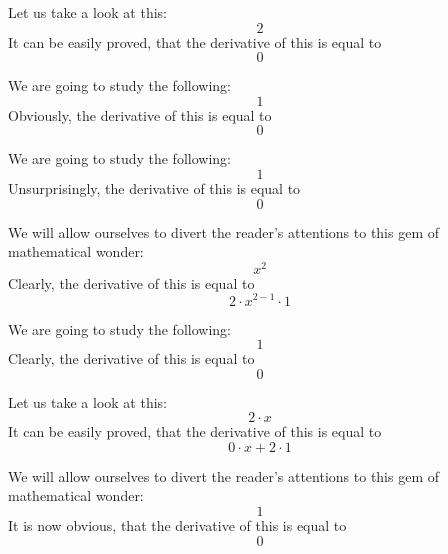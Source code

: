 \documentclass{article}
\begin{document}
Let us take a look at this:
\begin{equation}
2 
\end{equation}
It can be easily proved, that the derivative of this is equal to
\begin{equation}
0 
\end{equation}

We are going to study the following:
\begin{equation}
1 
\end{equation}
Obviously, the derivative of this is equal to
\begin{equation}
0 
\end{equation}

We are going to study the following:
\begin{equation}
1 
\end{equation}
Unsurprisingly, the derivative of this is equal to
\begin{equation}
0 
\end{equation}

We will allow ourselves to divert the reader's attentions to this gem of mathematical wonder:
\begin{equation}
x ^{2 } 
\end{equation}
Clearly, the derivative of this is equal to
\begin{equation}
2 \cdot x ^{2 - 1 } \cdot 1 
\end{equation}

We are going to study the following:
\begin{equation}
1 
\end{equation}
Clearly, the derivative of this is equal to
\begin{equation}
0 
\end{equation}

Let us take a look at this:
\begin{equation}
2 \cdot x 
\end{equation}
It can be easily proved, that the derivative of this is equal to
\begin{equation}
0 \cdot x + 2 \cdot 1 
\end{equation}

We will allow ourselves to divert the reader's attentions to this gem of mathematical wonder:
\begin{equation}
1 
\end{equation}
It is now obvious, that the derivative of this is equal to
\begin{equation}
0 
\end{equation}
\end{document}

